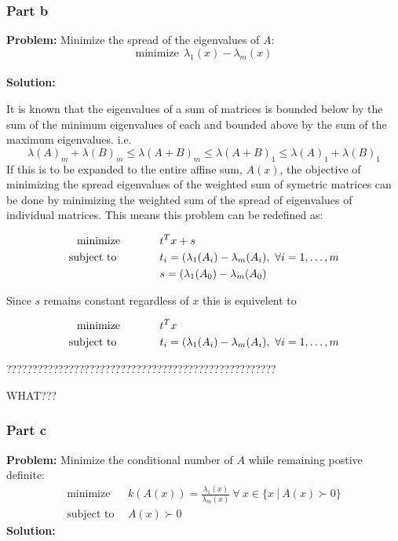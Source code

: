 \documentclass[letter]{article}
\newcommand{\optpblm}[3][eq:default]{
	\begin{equation}\label{#1}
		\begin{aligned}
			\text{minimize} \hspace{0.5in} &#2\vspace{5pt}\\
			\text{subject to \hspace{0.5in}} &#3
		\end{aligned}	
	\end{equation}
}
\begin{document}
\newpage
\subsubsection{Part b}
\textbf{Problem:}
Minimize the spread of the eigenvalues of $A$: $$\text{minimize} \ \ \lambda_1(x) - \lambda_m(x)$$\\
\textbf{Solution:}



It is known that the eigenvalues of a sum of matrices is bounded below by the sum of the minimum eigenvalues of each and bounded above by the sum of the maximum eigenvalues.
\cite{eigvalueBound}
i.e.
$$ \lambda(A)_m + \lambda(B)_m \leq \lambda(A+B)_m \leq \lambda(A+B)_1 \leq \lambda(A)_1 + \lambda(B)_1$$
If this is to be expanded to the entire affine sum, $A(x)$, the objective of minimizing the spread eigenvalues of the weighted sum of symetric matrices can be done by minimizing the weighted sum of the spread of eigenvalues of individual matrices.
This means this problem can be redefined as:
\optpblm{t^T x + s}{
	t_i = (\lambda_1(A_i) - \lambda_m(A_i), \ \forall i = 1,\dots,m\\
	&s = (\lambda_1(A_0) - \lambda_m(A_0)}
Since $s$ remains constant regardless of $x$ this is equivelent to
\optpblm{t^T x}{
	t_i = (\lambda_1(A_i) - \lambda_m(A_i), \ \forall i = 1,\dots,m}


????????????????????????????????????????????????????





WHAT???









\subsubsection{Part c}
\textbf{Problem:}
Minimize the conditional number of $A$ while remaining postive definite:
\begin{equation*}
	\begin{aligned}
		\text{minimize} \ \ &k(A(x)) = \frac{\lambda_1(x)}{\lambda_m(x)} \ \forall \ x \in \{x \ | \ A(x) \succ 0\}\\
		 \text{subject to} \ \ &A(x) \succ 0
	\end{aligned}
\end{equation*}
\textbf{Solution:}
\end{document}
